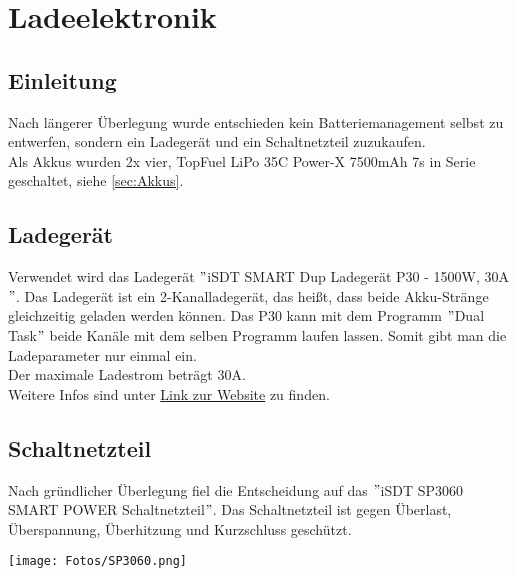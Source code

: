 \section{Ladeelektronik}
\subsection{Einleitung}
Nach längerer Überlegung wurde entschieden kein Batteriemanagement selbst zu entwerfen, sondern ein Ladegerät und ein Schaltnetzteil zuzukaufen. \\
Als Akkus wurden 2x vier, TopFuel LiPo 35C Power-X 7500mAh 7s in Serie geschaltet, siehe \ref{sec:Akkus}.

\subsection{Ladegerät}
Verwendet wird das Ladegerät $"$iSDT SMART Dup Ladegerät P30 - 1500W, 30A$"$. Das Ladegerät ist ein 2-Kanalladegerät, das heißt, 
dass beide Akku-Stränge gleichzeitig geladen werden können. 
Das P30 kann mit dem Programm $"$Dual Task$"$ beide Kanäle mit dem selben Programm laufen lassen. Somit gibt man die Ladeparameter nur einmal ein. \\
Der maximale Ladestrom beträgt 30$\mathrm{A}$. \\
Weitere Infos sind unter \href{https://www.modell-hubschrauber.at/Ladegeraete-Netzteile-Ladekabel-und-Zubehoer/Ladegeraete/Ladegeraete-12Volt/iSDT-SMART-Dup-Ladegeraet-P30-1500W-30A-8S-Lipo::43075.html}{Link zur Website} 
zu finden. 

\subsection{Schaltnetzteil}
Nach gründlicher Überlegung fiel die Entscheidung auf das $"$iSDT SP3060 SMART POWER Schaltnetzteil$"$.
Das Schaltnetzteil ist gegen Überlast, Überspannung, Überhitzung und Kurzschluss geschützt. 

\begin{minipage}{13cm}
    \centering
    \texttt{[image: Fotos/SP3060.png]}
\end{minipage}

